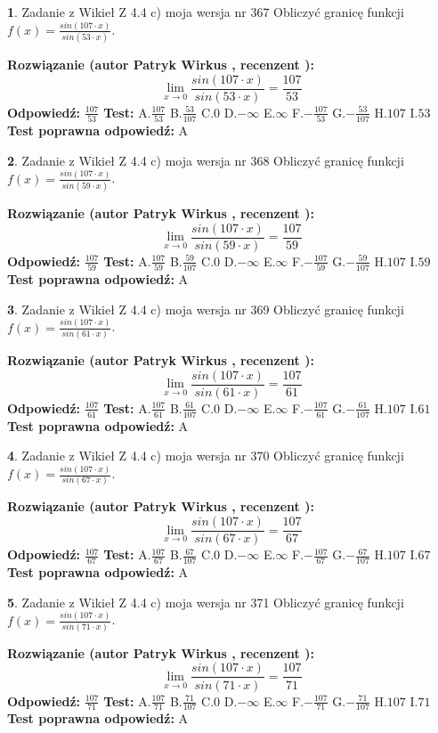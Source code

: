 \documentclass[12pt, a4paper]{article}
\theoremstyle{definition} %
\newtheorem{zad}{}
\newcommand{\zadStart}[1]{\begin{zad}#1\newline}
\newcommand{\zadStop}{\end{zad}}
\newcommand{\rozwStart}[2]{\noindent \textbf{Rozwiązanie (autor #1 , recenzent #2): }\newline}
\newcommand{\rozwStop}{\newline}
\newcommand{\odpStart}{\noindent \textbf{Odpowiedź:}\newline}
\newcommand{\odpStop}{\newline}
\newcommand{\testStart}{\noindent \textbf{Test:}\newline}
\newcommand{\testStop}{\newline}
\newcommand{\kluczStart}{\noindent \textbf{Test poprawna odpowiedź:}\newline}
\newcommand{\kluczStop}{\newline}
\begin{document}
\zadStart{Zadanie z Wikieł Z 4.4 c) moja wersja nr 367}
Obliczyć granicę funkcji $f(x)=\frac{sin(107\cdot x)}{sin(53\cdot x)}$.
\zadStop
\rozwStart{Patryk Wirkus}{}
$$\lim\limits_{x\to 0}\frac{sin(107\cdot x)}{sin(53\cdot x)}=
\frac{107}{53}$$
\rozwStop
\odpStart
$\frac{107}{53}$
\odpStop
\testStart
A.$\frac{107}{53}$
B.$\frac{53}{107}$
C.$0$
D.$-\infty$
E.$\infty$
F.$-\frac{107}{53}$
G.$-\frac{53}{107}$
H.$107$
I.$53$
\testStop
\kluczStart
A
\kluczStop



\zadStart{Zadanie z Wikieł Z 4.4 c) moja wersja nr 368}
Obliczyć granicę funkcji $f(x)=\frac{sin(107\cdot x)}{sin(59\cdot x)}$.
\zadStop
\rozwStart{Patryk Wirkus}{}
$$\lim\limits_{x\to 0}\frac{sin(107\cdot x)}{sin(59\cdot x)}=
\frac{107}{59}$$
\rozwStop
\odpStart
$\frac{107}{59}$
\odpStop
\testStart
A.$\frac{107}{59}$
B.$\frac{59}{107}$
C.$0$
D.$-\infty$
E.$\infty$
F.$-\frac{107}{59}$
G.$-\frac{59}{107}$
H.$107$
I.$59$
\testStop
\kluczStart
A
\kluczStop



\zadStart{Zadanie z Wikieł Z 4.4 c) moja wersja nr 369}
Obliczyć granicę funkcji $f(x)=\frac{sin(107\cdot x)}{sin(61\cdot x)}$.
\zadStop
\rozwStart{Patryk Wirkus}{}
$$\lim\limits_{x\to 0}\frac{sin(107\cdot x)}{sin(61\cdot x)}=
\frac{107}{61}$$
\rozwStop
\odpStart
$\frac{107}{61}$
\odpStop
\testStart
A.$\frac{107}{61}$
B.$\frac{61}{107}$
C.$0$
D.$-\infty$
E.$\infty$
F.$-\frac{107}{61}$
G.$-\frac{61}{107}$
H.$107$
I.$61$
\testStop
\kluczStart
A
\kluczStop



\zadStart{Zadanie z Wikieł Z 4.4 c) moja wersja nr 370}
Obliczyć granicę funkcji $f(x)=\frac{sin(107\cdot x)}{sin(67\cdot x)}$.
\zadStop
\rozwStart{Patryk Wirkus}{}
$$\lim\limits_{x\to 0}\frac{sin(107\cdot x)}{sin(67\cdot x)}=
\frac{107}{67}$$
\rozwStop
\odpStart
$\frac{107}{67}$
\odpStop
\testStart
A.$\frac{107}{67}$
B.$\frac{67}{107}$
C.$0$
D.$-\infty$
E.$\infty$
F.$-\frac{107}{67}$
G.$-\frac{67}{107}$
H.$107$
I.$67$
\testStop
\kluczStart
A
\kluczStop



\zadStart{Zadanie z Wikieł Z 4.4 c) moja wersja nr 371}
Obliczyć granicę funkcji $f(x)=\frac{sin(107\cdot x)}{sin(71\cdot x)}$.
\zadStop
\rozwStart{Patryk Wirkus}{}
$$\lim\limits_{x\to 0}\frac{sin(107\cdot x)}{sin(71\cdot x)}=
\frac{107}{71}$$
\rozwStop
\odpStart
$\frac{107}{71}$
\odpStop
\testStart
A.$\frac{107}{71}$
B.$\frac{71}{107}$
C.$0$
D.$-\infty$
E.$\infty$
F.$-\frac{107}{71}$
G.$-\frac{71}{107}$
H.$107$
I.$71$
\testStop
\kluczStart
A
\kluczStop
\end{document}
